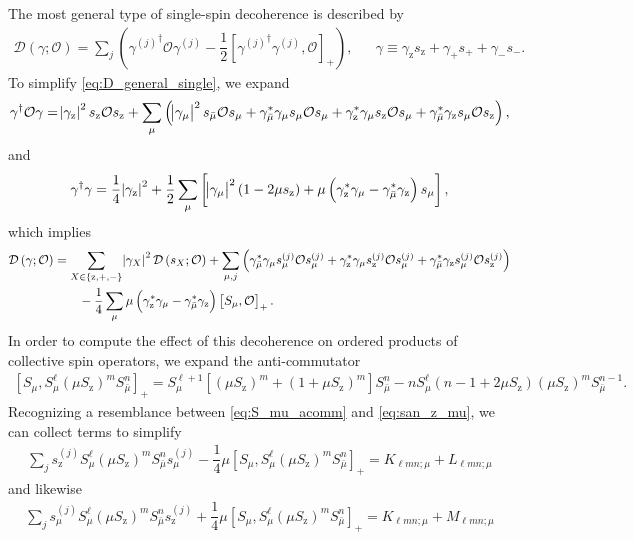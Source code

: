 \documentclass[aps,11pt,notitlepage,nofootinbib,longbibliography]{revtex4-1}
\newcommand{\f}[2]{\dfrac{#1}{#2}} %
\newcommand{\p}[1]{\left(#1\right)} %
\renewcommand{\sp}[1]{\left[#1\right]} %
\renewcommand{\set}[1]{\left\{#1\right\}} %
\newcommand{\D}{\mathcal{D}}
\renewcommand{\O}{\mathcal{O}}
\newcommand{\z}{\text{z}}
\newcommand{\bmu}{{\bar\mu}}
\newcommand{\1}{\mathds{1}}
\begin{document}
The most general type of single-spin decoherence is described by
\begin{align}
  \D\p{\gamma;\O}
  = \sum_j\p{{\gamma^{(j)}}^\dag \O \gamma^{(j)}
    - \f12\sp{{\gamma^{(j)}}^\dag \gamma^{(j)}, \O}_+},
  &&
  \gamma \equiv \gamma_\z s_\z + \gamma_+ s_+ + \gamma_- s_-.
  \label{eq:D_general_single}
\end{align}
To simplify \eqref{eq:D_general_single}, we expand
\begin{align}
  \gamma^\dag \O \gamma
  = \abs{\gamma_\z}^2 s_\z \O s_\z
  + \sum_\mu \p{\abs{\gamma_\mu}^2 s_\bmu \O s_\mu
    + \gamma_\bmu^* \gamma_\mu s_\mu \O s_\mu
    + \gamma_\z^* \gamma_\mu s_\z \O s_\mu
    + \gamma_\bmu^* \gamma_\z s_\mu \O s_\z},
\end{align}
and
\begin{align}
  \gamma^\dag \gamma
  = \f14 \abs{\gamma_\z}^2
  + \f12 \sum_\mu \sp{\abs{\gamma_\mu}^2 \p{1-2\mu s_\z}
    + \mu \p{\gamma_\z^*\gamma_\mu - \gamma_\bmu^*\gamma_\z} s_\mu},
\end{align}
which implies
\begin{align}
  \D\p{\gamma;\O}
  &= \sum_{X\in\set{\z,+,-}} \abs{\gamma_X}^2 \D\p{s_X;\O}
  + \sum_{\mu,j}
  \p{\gamma_\bmu^* \gamma_\mu s_\mu^{(j)} \O s_\mu^{(j)}
    + \gamma_\z^* \gamma_\mu s_\z^{(j)} \O s_\mu^{(j)}
    + \gamma_\bmu^* \gamma_\z s_\mu^{(j)} \O s_\z^{(j)}}
  \notag \\
  &\qquad -\f14 \sum_\mu \mu
  \p{\gamma_\z^*\gamma_\mu - \gamma_\bmu^*\gamma_\z} \sp{S_\mu, \O}_+.
\end{align}
In order to compute the effect of this decoherence on ordered products
of collective spin operators, we expand the anti-commutator
\begin{align}
  \sp{S_\mu, S_\mu^\ell \p{\mu S_\z}^m S_\bmu^n}_+
  = S_\mu^{\ell+1} \sp{\p{\mu S_\z}^m+\p{1+\mu S_\z}^m} S_\bmu^n
  - n S_\mu^\ell \p{n-1+2\mu S_\z} \p{\mu S_\z}^m S_\bmu^{n-1}.
  \label{eq:S_mu_acomm}
\end{align}
Recognizing a resemblance between \eqref{eq:S_mu_acomm} and
\eqref{eq:san_z_mu}, we can collect terms to simplify
\begin{align}
  \sum_j s_\z^{(j)} S_\mu^\ell \p{\mu S_\z}^m S_\bmu^n s_\mu^{(j)}
  - \f14 \mu \sp{S_\mu, S_\mu^\ell \p{\mu S_\z}^m S_\bmu^n}_+
  = K_{\ell mn;\mu} + L_{\ell mn;\mu}
  \label{eq:dec_z_mu}
\end{align}
and likewise
\begin{align}
  \sum_j s_\mu^{(j)} S_\mu^\ell \p{\mu S_\z}^m S_\bmu^n s_\z^{(j)}
  + \f14 \mu \sp{S_\mu, S_\mu^\ell \p{\mu S_\z}^m S_\bmu^n}_+
  = K_{\ell mn;\mu} + M_{\ell mn;\mu}
  \label{eq:dec_mu_z}
\end{align}
\end{document}
